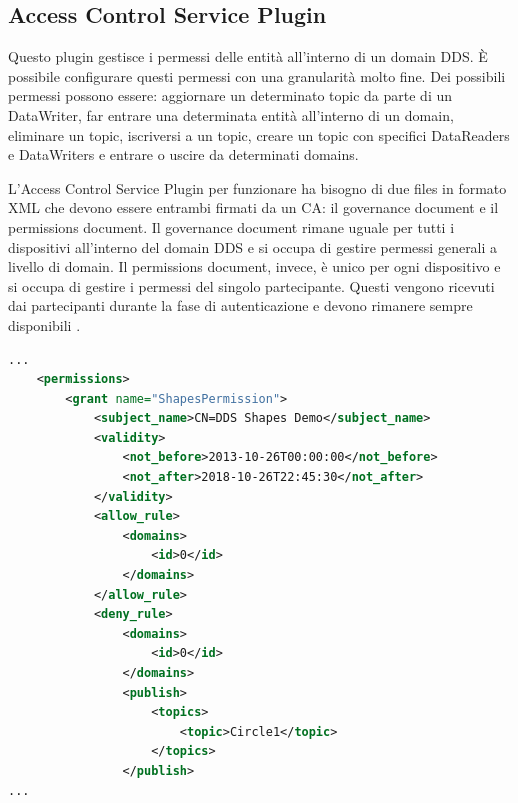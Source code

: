 \subsection{Access Control Service Plugin}

Questo plugin gestisce i permessi delle entità all'interno di 
un domain DDS. È possibile configurare questi permessi con una 
granularità molto fine. Dei possibili permessi possono essere:
aggiornare un determinato topic da parte di 
un DataWriter, far entrare una determinata entità
all'interno di un domain, eliminare un topic, iscriversi a un topic, 
creare un topic con specifici DataReaders e DataWriters e
entrare o uscire da determinati domains.

L'Access Control Service Plugin per funzionare ha bisogno di due 
files in formato XML che devono essere entrambi firmati da 
un CA: il governance document e il permissions document.
Il governance document rimane uguale per tutti i dispositivi 
all'interno del domain DDS e si occupa di gestire 
permessi generali a livello di domain. Il permissions document,
invece, è unico per ogni dispositivo e si occupa di gestire i 
permessi del singolo partecipante.
Questi vengono ricevuti dai partecipanti durante la fase di
autenticazione e devono rimanere sempre disponibili \cite{essay93639}.



\vspace{5mm} %
\begin{lstlisting}[language=XML, caption=Estratto di permissions
    document{,} tratto da documento di riferimento 
    del DDS Security versione 1.1 \cite{ddssecurity1.1}.
    , label=XML permission file,
    captionpos=b]
...
    <permissions>
        <grant name="ShapesPermission">
            <subject_name>CN=DDS Shapes Demo</subject_name>
            <validity>
                <not_before>2013-10-26T00:00:00</not_before>
                <not_after>2018-10-26T22:45:30</not_after>
            </validity>
            <allow_rule>
                <domains>
                    <id>0</id>
                </domains>
            </allow_rule>
            <deny_rule>
                <domains>
                    <id>0</id>
                </domains>
                <publish>
                    <topics>
                        <topic>Circle1</topic>
                    </topics>
                </publish>
...
    \end{lstlisting}
\vspace{5mm}
\label{Access Control Service Plugin}

